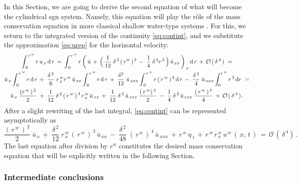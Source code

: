 \documentclass[alpha-refs, 12pt]{wiley-article}
\renewcommand{\O}{\mathcal{O}}
\begin{document}
In this Section, we are going to derive the second equation of what will become the cylindrical \acrshort{sgn} system. Namely, this equation will play the r\^ole of the mass conservation equation in more classical shallow water-type systems \citep{Dutykh2013, Dutykh2011b, Dutykh2014c, Dutykh2014f, Clamond2019, cheviakov2024analytical}. For this, we return to the integrated version of the continuity \cref{eq:contint}, and we substitute the approximation \eqref{eq:urep} for the horizontal velocity:
\begin{multline*}
  \int_{\,0}^{\,r^{\,w}}r\,u_{\,x}\,\mathrm{d}\,r\,=\, \int_{\,0}^{\,r^{\,w}}r\,\biggl(\,\bar{u}\,+\,\Bigl(\,\frac{1}{12}\;\delta^{\,2}\,(\,r^{w}\,)^{\,2}\,-\;\frac{1}{4}\;\delta^{\,2}r^{\,2}\,\Bigr)\,\bar{u}_{\,xx}\,\biggr)_{\,x}\,\mathrm{d}\,r\,+\,\O\,(\,\delta^{\,4}\,)\ =\\
  \bar{u}_{\,x}\int_{\,0}^{\,r^{\,w}}r\,\mathrm{d}\,r\,+\; \frac{\delta^{\,2}}{6}\;r^{\,w}_{\,x}r^{\,w}\,\bar{u}_{\,xx} \int_{\,0}^{\,r^{\,w}}r\,\mathrm{d}\,r\,+\;\frac{\delta^{2}}{12}\;\bar{u}_{\,xxx}\int_{\,0}^{\,r^{\,w}}r\,(\,r^{\,w}\,)^{\,2}\,\mathrm{d}\,r\,-\;\frac{\delta^{\,2}}{4}\;\bar{u}_{\,xxx} \int_{0}^{r^{\,w}}r^{\,3}\,\mathrm{d}r\ =\\
  \bar{u}_{\,x}\;\frac{(r^{\,w}\,)^{\,2}}{2}\;+\;\frac{1}{12}\;\delta^{\,2}\,(\,r^{\,w}\,)^{\,3}\,r^{\,w}_{\,x}\,\bar{u}_{\,xx}\,+\;\frac{1}{12}\;\delta^{\,2}\,\bar{u}_{\,xxx}\;\frac{(\,r^{\,w})^{\,4}}{2}\;-\;\frac{1}{4}\;\delta^{\,2}\,\bar{u}_{\,xxx}\;\frac{(\,r^{\,w}\,)^{\,4}}{4}\; +\,\O\,(\,\delta^{\,4}\,)\,.
\end{multline*}
After a slight rewriting of the last integral, \cref{eq:contint} can be represented asymptotically as
\begin{equation*}
  \frac{(\,r^{\,w}\,)^{\,2}}{2}\;\bar{u}_{\,x}\,+\;\frac{\delta^{\,2}}{12}\;r^{\,w}_{\,x}\,(\,r^{\,w}\,)^{\,3}\,\bar{u}_{\,xx}\,-\;\frac{\delta^{\,2}}{48}\;(\,r^{\,w}\,)^{\,4}\,\bar{u}_{\,xxx}\,+\,r^{\,w}\,\eta_{\;t}\,+\,r^{\,w}\,r^{\,w}_{\,x}\,u^{\,w}\,(\,x,\,t\,)\, = \, \O\,(\,\delta^{\,4})\,.
\end{equation*}
The last equation after division by $r^w$ constitutes the desired mass conservation equation that will be explicitly written in the following Section.

\subsubsection{Intermediate conclusions}
\end{document}
